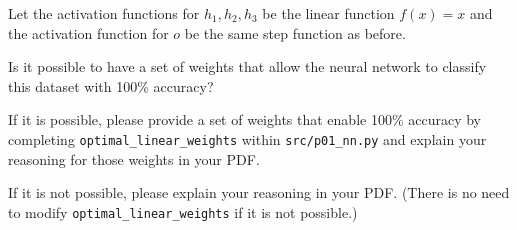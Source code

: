 \ifnum{} {
  \clearpage
} \fi
\item {} Let the activation functions for $h_1, h_2, h_3$ be the linear function $f(x) = x$ and the activation function for $o$ be the same step function as before.

Is it possible to have a set of weights that allow the neural network to classify this dataset with 100\% accuracy?

If it is possible, please provide a set of weights that enable 100\% accuracy by completing \texttt{optimal\_linear\_weights} within \texttt{src/p01\_nn.py} and explain your reasoning for those weights in your PDF.

If it is not possible, please explain your reasoning in your PDF. (There is no need to modify \texttt{optimal\_linear\_weights} if it is not possible.)


\ifnum{} {
  
} \fi
